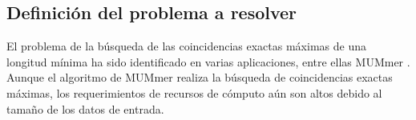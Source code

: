 \documentclass[12pt,a4paper]{article}
\providecommand{\e}[1]{\ensuremath{\times 10^{#1}}}
\begin{document}
\subsection{Definición del problema a resolver}
\indent
El problema de la búsqueda de las coincidencias exactas máximas de una longitud mínima ha sido identificado en varias aplicaciones, entre ellas MUMmer \cite{Mummer3}. Aunque el algoritmo de MUMmer realiza la búsqueda de coincidencias exactas máximas, los requerimientos de recursos de cómputo aún son altos debido al tamaño de los datos de entrada.\\
\indent
\end{document}
